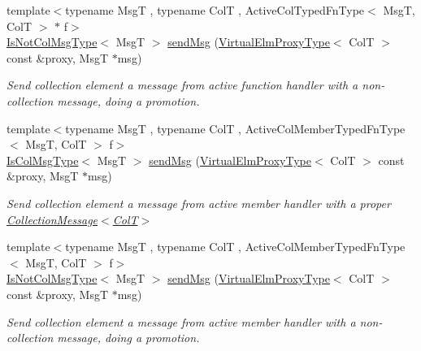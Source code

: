 \begin{DoxyCompactItemize}
{\footnotesize template$<$typename MsgT , typename ColT , Active\+Col\+Typed\+Fn\+Type$<$ Msg\+T, Col\+T $>$ $\ast$ f$>$ }\\\hyperlink{structvt_1_1vrt_1_1collection_1_1_collection_manager_ae376deeefd4f89a0b1c93849977715d9}{Is\+Not\+Col\+Msg\+Type}$<$ MsgT $>$ \hyperlink{structvt_1_1vrt_1_1collection_1_1_collection_manager_a4f87f7f738cde8d48c9c18d16cc06166}{send\+Msg} (\hyperlink{namespacevt_1_1vrt_a620a5c8c59d13e513f690c74b4af516f}{Virtual\+Elm\+Proxy\+Type}$<$ ColT $>$ const \&proxy, MsgT $\ast$msg)
\begin{DoxyCompactList}\small\item\em Send collection element a message from active function handler with a non-\/collection message, doing a promotion. \end{DoxyCompactList}\item 
{\footnotesize template$<$typename MsgT , typename ColT , Active\+Col\+Member\+Typed\+Fn\+Type$<$ Msg\+T, Col\+T $>$ f$>$ }\\\hyperlink{structvt_1_1vrt_1_1collection_1_1_collection_manager_a21c21612c806016788057aeab142af20}{Is\+Col\+Msg\+Type}$<$ MsgT $>$ \hyperlink{structvt_1_1vrt_1_1collection_1_1_collection_manager_a3ea2d130487c02b8dbda05b7befda88d}{send\+Msg} (\hyperlink{namespacevt_1_1vrt_a620a5c8c59d13e513f690c74b4af516f}{Virtual\+Elm\+Proxy\+Type}$<$ ColT $>$ const \&proxy, MsgT $\ast$msg)
\begin{DoxyCompactList}\small\item\em Send collection element a message from active member handler with a proper {\ttfamily \hyperlink{structvt_1_1vrt_1_1collection_1_1_collection_message}{Collection\+Message$<$\+Col\+T$>$}} \end{DoxyCompactList}\item 
{\footnotesize template$<$typename MsgT , typename ColT , Active\+Col\+Member\+Typed\+Fn\+Type$<$ Msg\+T, Col\+T $>$ f$>$ }\\\hyperlink{structvt_1_1vrt_1_1collection_1_1_collection_manager_ae376deeefd4f89a0b1c93849977715d9}{Is\+Not\+Col\+Msg\+Type}$<$ MsgT $>$ \hyperlink{structvt_1_1vrt_1_1collection_1_1_collection_manager_a229f96a5075562ee92743d69fc285254}{send\+Msg} (\hyperlink{namespacevt_1_1vrt_a620a5c8c59d13e513f690c74b4af516f}{Virtual\+Elm\+Proxy\+Type}$<$ ColT $>$ const \&proxy, MsgT $\ast$msg)
\begin{DoxyCompactList}\small\item\em Send collection element a message from active member handler with a non-\/collection message, doing a promotion. \end{DoxyCompactList}\item 

\end{DoxyCompactItemize}

